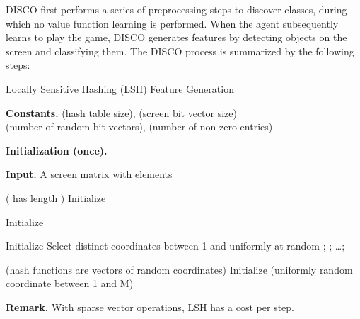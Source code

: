 \documentclass[twoside,11pt]{article}
\begin{document}
DISCO first performs a series of preprocessing steps to discover classes,
during which no value function learning is performed. When the agent subsequently learns 
to play the game, DISCO generates features by detecting objects on the screen and classifying them. 
The DISCO process is summarized by the following steps:

\begin{algorithm}
\caption{Locally Sensitive Hashing (LSH) Feature Generation\label{algo:lsh_feature_generation}}
\begin{algorithmic}
\item[\textbf{Constants.}]  (hash table size),  (screen bit vector size) \\
   (number of random bit vectors),  (number of non-zero entries) 
\item[\textbf{Initialization (once).}]
\STATE  
\STATE  
\STATE
\item[\textbf{Input.}] A screen matrix  with elements 
\STATE

\item[]
\STATE  ( has length )
\STATE Initialize  
\FOR{} 
  \STATE 
  \FOR{}
    \STATE  {} 
  \ENDFOR
  \STATE  {}
\ENDFOR
\STATE
\item[]
\STATE Initialize 
\FOR{,  ()}
  \STATE 
\ENDFOR
\RETURN 
\STATE

\item[]
\STATE Initialize 
\FOR{}
  \STATE Select  distinct coordinates between 1 and  uniformly at random 
  \STATE ; ; \dots ; 
\ENDFOR
\RETURN 
\STATE

\item[ (hash functions are vectors of random coordinates)]
\STATE Initialize 
\FOR{, }
  \STATE  (uniformly random coordinate between 1 and M)
\ENDFOR
\RETURN 
\STATE
\item[\textbf{Remark.} With sparse vector operations, LSH has a  cost per step.] 

\end{algorithmic}
\end{algorithm}
\end{document}
